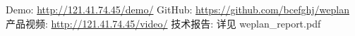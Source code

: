 \documentclass[10pt,a4paper]{ctexart}
\begin{document}
\vspace{2pt}
\noindent{\color{primary}\rule{\linewidth}{1pt}}
\vspace{1pt}
\begin{center}
{\scriptsize Demo: \url{http://121.41.74.45/demo/} \quad
GitHub: \url{https://github.com/bcefghj/weplan} \quad
产品视频: \url{http://121.41.74.45/video/} \quad
技术报告: 详见 weplan\_report.pdf}
\end{center}
\end{document}
